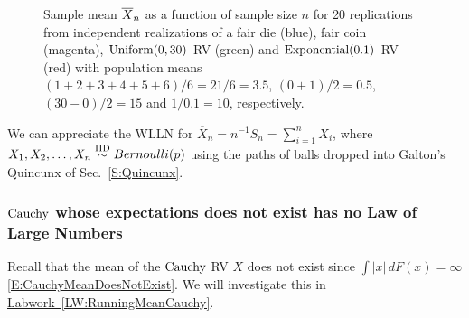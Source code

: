 \begin{figure}[htpb]
\caption{Sample mean $\overline{X}_n$ as a function of sample size $n$ for 20 replications from independent realizations of a fair die (blue), fair coin (magenta), $\mbox{{\rm Uniform}}(0,30)$ RV (green) and $\mbox{{\rm Exponential}}(0.1)$ RV (red) with population means $(1+2+3+4+5+6)/6=21/6=3.5$, $(0+1)/2=0.5$, $(30-0)/2=15$ and $1/0.1=10$, respectively.\label{F:RunningMeansFairDieFairCoinUnif01Exp1By10}}
\centering   {}
\end{figure}

\begin{example}\label{EgBernoulliWLLN}
We can appreciate the WLLN for $\overline{X}_n = n^{-1} S_n = \sum_{i=1}^{n} X_i$, where $X_1,X_2,\ldots,X_n \overset{{\rm IID}}{\sim} Bernoulli(p)$ using the paths of balls dropped into Galton's Quincunx of Sec.~\ref{S:Quincunx}.
\end{example}

\subsubsection{$\mbox{{\rm Cauchy}}$ whose expectations does not exist has no Law of Large Numbers}

 Recall that the mean of the $\mbox{{\rm Cauchy}}$ RV $X$ does not exist since $\int \left|x\right|\,dF(x) = \infty$ \eqref{E:CauchyMeanDoesNotExist}.  We will investigate this in \hyperref[LW:RunningMeanCauchy]{Labwork~\ref*{LW:RunningMeanCauchy}}.

